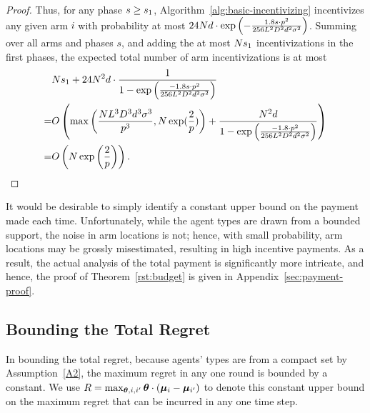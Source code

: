 \begin{proof}
Thus, for any phase $s \geq s_1$,
Algorithm~\ref{alg:basic-incentivizing} incentivizes any given arm $i$
with probability at most
$24 N d \cdot \exp \left(
  -\frac{1.8 s \cdot p^2}{256 L^2 D^2 d^2 \sigma^2}
\right)$.
Summing over all arms and phases $s$,
and adding the at most $N s_1$ incentivizations in
the first \EvenLaterPhase phases, 
the expected total number of arm incentivizations is at most
\begin{align*}
&N s_1
  + 24 N^2 d \cdot \frac{1}{1 - \exp \left(
    \frac{-1.8 s \cdot p^2}{256 L^2 D^2 d^2 \sigma^2}
  \right)} \nonumber \\
=& O\left( \max\left(\frac{N L^3 D^3 d^3 \sigma^3}{p^3}, N\exp(\frac{2}{p})\right)
  + \frac{N^2 d}{1 - \exp \left(
    \frac{-1.8 \cdot p^2}{256 L^2 D^2 d^2 \sigma^2}
  \right)} \right) \nonumber  \\
=& O\left( N\exp\left(\frac{2}{p}\right) \right).
\end{align*}

\end{proof}

It would be desirable to simply identify a constant upper bound on the
payment made each time.
Unfortunately, while the agent types are drawn from a bounded support,
the noise in arm locations is not;
hence, with small probability, arm locations may be grossly
misestimated, resulting in high incentive payments.
As a result, the actual analysis of the total payment is significantly more
intricate, and hence,
the proof of Theorem~\ref{rst:budget} is given in
Appendix~\ref{sec:payment-proof}.


\subsection{Bounding the Total Regret}
In bounding the total regret, because agents' types are from a compact
set by Assumption~\ref{A2}, the maximum regret in any one round is
bounded by a constant.
We use $R = \max_{\bm{\theta}, i,i'} \bm{\theta} \cdot (\bm{\mu}_{i} - \bm{\mu}_{i'})$
to denote this constant upper bound on the maximum regret that can be
incurred in any one time step. 


